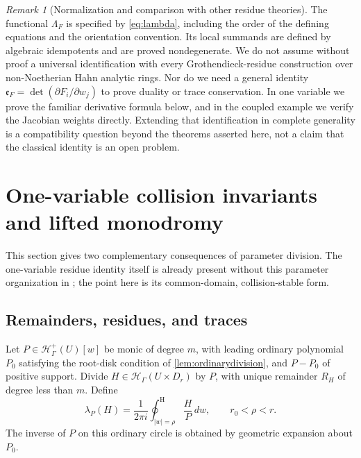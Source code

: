 \documentclass[11pt,oneside]{article}
\numberwithin{equation}{section}
\theoremstyle{definition}
\theoremstyle{remark}\newtheorem{remark}[theorem]{Remark}
\newcommand{\HH}{\mathcal H_{\Gamma}}
\newcommand{\Hp}{\mathcal H^{+}_{\Gamma}}
\newcommand{\hoint}{\mathop{\oint}\nolimits^{\mathrm H}}
\begin{document}
\begin{remark}[Normalization and comparison with other residue theories]\label{rem:residuecomparison}
The functional \(\Lambda_F\) is specified by \eqref{eq:lambda}, including the order of the defining equations and the orientation convention. Its local summands are defined by algebraic idempotents and are proved nondegenerate. We do not assume without proof a universal identification with every Grothendieck-residue construction over non-Noetherian Hahn analytic rings. Nor do we need a general identity \(\mathfrak e_F=\det(\partial F_i/\partial w_j)\) to prove duality or trace conservation. In one variable we prove the familiar derivative formula below, and in the coupled example we verify the Jacobian weights directly. Extending that identification in complete generality is a compatibility question beyond the theorems asserted here, not a claim that the classical identity is an open problem.
\end{remark}

\section{One-variable collision invariants and lifted monodromy}\label{sec:onevar}
This section gives two complementary consequences of parameter division. The one-variable residue identity itself is already present without this parameter organization in \cite{Source}; the point here is its common-domain, collision-stable form.

\subsection{Remainders, residues, and traces}
Let \(P\in\Hp(U)[w]\) be monic of degree \(m\), with leading ordinary polynomial \(P_0\) satisfying the root-disk condition of \cref{lem:ordinarydivision}, and \(P-P_0\) of positive support. Divide \(H\in\HH(U\times D_r)\) by \(P\), with unique remainder \(R_H\) of degree less than \(m\). Define
\[
 \lambda_P(H)=\frac1{2\pi i}\hoint_{|w|=\rho}\frac{H}{P}\,dw,
 \qquad r_0<\rho<r.
\]
The inverse of \(P\) on this ordinary circle is obtained by geometric expansion about \(P_0\).
\end{document}
